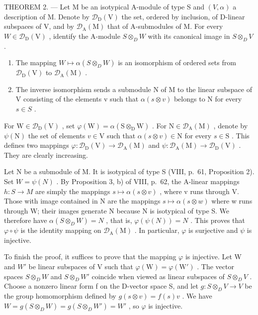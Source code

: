 THEOREM 2. --- Let M be an isotypical A-module of type S and \((V,\alpha)\) a description of M. Denote by \(\mathcal{D}_{\mathrm{D}}(\mathrm{V})\) the set, ordered by inclusion, of D-linear subspaces of V, and by \(\mathcal{D}_{\mathrm{A}}(\mathrm{M})\) that of A-submodules of M. For every \(W \in \mathcal{D}_{\mathrm{D}}(\mathrm{V})\) , identify the A-module \(S \otimes_{D} W\) with its canonical image in \(S \otimes_{D} V\) .

\begin{enumerate}
\def\labelenumi{\alph{enumi})}
\item
  The mapping \(W \mapsto \alpha(S \otimes_{D} W)\) is an isomorphism of ordered sets from \(\mathcal{D}_{\mathrm{D}}(\mathrm{V})\) to \(\mathcal{D}_{\mathrm{A}}(\mathrm{M})\) .
\item
  The inverse isomorphism sends a submodule N of M to the linear subspace of V consisting of the elements v such that \(\alpha(s \otimes v)\) belongs to N for every \(s \in S\) .
\end{enumerate}

For \(\mathrm{W} \in \mathcal{D}_{\mathrm{D}}(\mathrm{V})\) , set \(\varphi(\mathrm{W}) = \alpha(\mathrm{S} \otimes_{\mathrm{D}} \mathrm{W})\) . For \(\mathrm{N} \in \mathcal{D}_{\mathrm{A}}(\mathrm{M})\) , denote by \(\psi(\mathrm{N})\) the set of elements \(v \in \mathrm{V}\) such that \(\alpha(s \otimes v) \in \mathrm{N}\) for every \(s \in \mathrm{S}\) . This defines two mappings \(\varphi: \mathcal{D}_{\mathrm{D}}(\mathrm{V}) \to \mathcal{D}_{\mathrm{A}}(\mathrm{M})\) and \(\psi: \mathcal{D}_{\mathrm{A}}(\mathrm{M}) \to \mathcal{D}_{\mathrm{D}}(\mathrm{V})\) . They are clearly increasing.

Let N be a submodule of M. It is isotypical of type S (VIII, p.~61, Proposition 2). Set \(W = \psi(N)\) . By Proposition 3, b) of VIII, p.~62, the A-linear mappings \(h : S \to M\) are simply the mappings \(s \mapsto \alpha(s \otimes v)\) , where v runs through V. Those with image contained in N are the mappings \(s \mapsto \alpha(s \otimes w)\) where w runs through W; their images generate N because N is isotypical of type S. We therefore have \(\alpha(S \otimes_{D} W) = N\) , that is, \(\varphi(\psi(N)) = N\) . This proves that \(\varphi \circ \psi\) is the identity mapping on \(\mathcal{D}_{\mathrm{A}}(\mathrm{M})\) . In particular, \(\varphi\) is surjective and \(\psi\) is injective.

To finish the proof, it suffices to prove that the mapping \(\varphi\) is injective. Let W and \(W'\) be linear subspaces of V such that \(\varphi(\mathrm{W}) = \varphi(\mathrm{W}')\) . The vector spaces \(S \otimes_{D} W\) and \(S \otimes_{D} W'\) coincide when viewed as linear subspaces of \(S \otimes_{D} V\) . Choose a nonzero linear form f on the D-vector space S, and let \(g : S \otimes_{D} V \to V\) be the group homomorphism defined by \(g(s \otimes v) = f(s)v\) . We have \(W = g(S \otimes_{D} W) = g(S \otimes_{D} W') = W'\) , so \(\varphi\) is injective.

